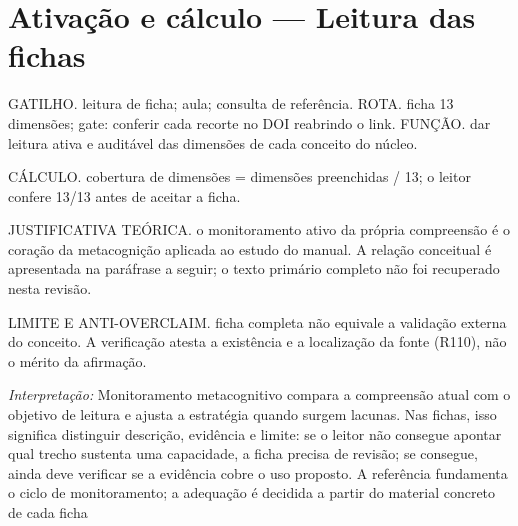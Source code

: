 \section[Ativação e cálculo]{Ativação e cálculo — Leitura das fichas}

\begin{processo}
GATILHO. leitura de ficha; aula; consulta de referência.
ROTA. ficha 13 dimensões; gate: conferir cada recorte no DOI reabrindo o link.
FUNÇÃO. dar leitura ativa e auditável das dimensões de cada conceito do núcleo.
\end{processo}

\begin{resultado}
CÁLCULO. cobertura de dimensões = dimensões preenchidas / 13; o leitor confere 13/13 antes de aceitar a ficha.
\end{resultado}

\begin{descricao}
JUSTIFICATIVA TEÓRICA. o monitoramento ativo da própria compreensão é o coração da metacognição aplicada ao estudo do manual. A relação conceitual é apresentada na paráfrase a seguir; o texto primário completo não foi recuperado nesta revisão.
\end{descricao}

\begin{aviso}
LIMITE E ANTI-OVERCLAIM. ficha completa não equivale a validação externa do conceito. A verificação atesta a existência e a
localização da fonte (R110), não o mérito da afirmação.
\end{aviso}

\noindent\textit{Interpretação:} Monitoramento metacognitivo compara a compreensão atual com o objetivo de leitura e ajusta a estratégia quando surgem lacunas. Nas fichas, isso significa distinguir descrição, evidência e limite: se o leitor não consegue apontar qual trecho sustenta uma capacidade, a ficha precisa de revisão; se consegue, ainda deve verificar se a evidência cobre o uso proposto. A referência fundamenta o ciclo de monitoramento; a adequação é decidida a partir do material concreto de cada ficha 

